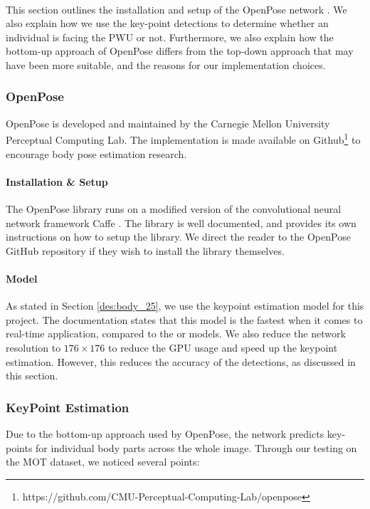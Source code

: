 \paragraph{} This section outlines the installation and setup of the OpenPose network \cite{Shao}. We also explain how we use the key-point detections to determine whether an individual is facing the PWU or not. Furthermore, we also explain how the bottom-up approach of OpenPose differs from the top-down approach that may have been more suitable, and the reasons for our implementation choices.

\subsubsection{OpenPose}
OpenPose is developed and maintained by the Carnegie Mellon University Perceptual Computing Lab. The implementation is made available on Github\footnote{https://github.com/CMU-Perceptual-Computing-Lab/openpose} to encourage body pose estimation research.

\paragraph{Installation \& Setup} The OpenPose library runs on a modified version of the convolutional neural network framework Caffe \cite{Jia}. The library is well documented, and provides its own instructions on how to setup the library. We direct the reader to the OpenPose GitHub repository if they wish to install the library themselves.

\paragraph{Model} As stated in Section \ref{des:body_25}, we use the  keypoint estimation model for this project. The documentation states that this model is the fastest when it comes to real-time application, compared to the  or  models. We also reduce the network resolution to $176\times 176$ to reduce the GPU usage and speed up the keypoint estimation. However, this reduces the accuracy of the detections, as discussed in this section.

\subsubsection{KeyPoint Estimation} \label{sec:bottomUp} 
Due to the bottom-up approach used by OpenPose, the network predicts key-points for individual body parts across the whole image. Through our testing on the MOT dataset, we noticed several points:

